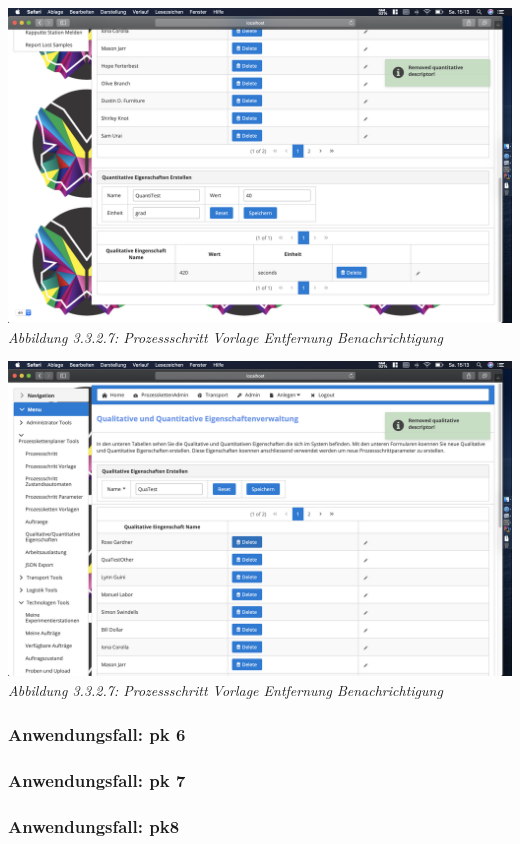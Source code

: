\documentclass[enabledeprecatedfontcommands,fontsize=12pt,paper=a4,twoside]{scrartcl}
\begin{document}
\hypertarget{sc3.3.3.7}{
\includegraphics[width=1\textwidth]{Screenshots/336RemoveMeldungqt.png}
\textit{Abbildung 3.3.2.7: Prozessschritt Vorlage Entfernung Benachrichtigung}
}  
\hypertarget{sc3.3.3.7}{
\includegraphics[width=1\textwidth]{Screenshots/336RemoveMledungql.png}
\textit{Abbildung 3.3.2.7: Prozessschritt Vorlage Entfernung Benachrichtigung}
}  
\subsubsection{Anwendungsfall: pk 6}


\subsubsection{Anwendungsfall: pk 7}


\subsubsection{Anwendungsfall: pk8 }
\end{document}
